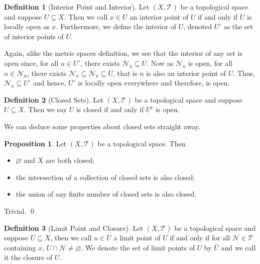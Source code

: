 \documentclass[
]{article}
\theoremstyle{definition}
\newtheorem{prop}{Proposition}
\theoremstyle{definition}
\newtheorem{definition}{Definition}[section]
\begin{document}
\begin{definition}[Interior Point and Interior]
  Let \((X, \mathcal{T})\) be a topological space and suppose \(U \subseteq X\).
  Then we call \(x \in U\) an interior point of \(U\) if and only if \(U\) is 
  locally open as \(x\). Furthermore, we define the interior of \(U\), denoted 
  \(U^\circ\) as the set of interior points of \(U\).
\end{definition}

Again, alike the metric spaces definition, we see that the interior of
any set is open since, for all \(u \in U^\circ\), there exists
\(\mathcal{N}_u \subseteq U\). Now as \(\mathcal{N}_u\) is open, for all
\(n \in \mathcal{N}_u\), there exists
\(\mathcal{N}_n \subseteq \mathcal{N}_u \subseteq U\), that is \(n\) is
also an interior point of \(U\). Thus,
\(\mathcal{N}_u \subseteq U^\circ\) and hence, \(U^\circ\) is locally
open everywhere and therefore, is open.

\begin{definition}[Closed Sets]
  Let \((X, \mathcal{T})\) be a topological space and suppose \(U \subseteq X\). 
  Then we say \(U\) is closed if and only if \(U^c\) is open.
\end{definition}

We can deduce some properties about closed sets straight away.

\begin{prop}
  Let \((X, \mathcal{T})\) be a topological space. Then 
  \begin{itemize}
    \item \(\varnothing\) and \(X\) are both closed;
    \item the intersection of a collection of closed sets is also closed;
    \item the union of any finite number of closed sets is also closed.
  \end{itemize}
\end{prop}
\proof

Trivial. \qed

\begin{definition}[Limit Point and Closure]
  Let \((X, \mathcal{T})\) be a topological space and suppose \(U \subseteq X\),
  then we call \(u \in U\) a limit point of \(U\) if and only if for all 
  \(\mathcal{N} \in \mathcal{T}\) containing \(x\), 
  \(U \cap \mathcal{N} \neq \varnothing\). We denote the set of limit points 
  of \(U\) by \(\bar{U}\) and we call it the closure of \(U\).
\end{definition}
\end{document}
